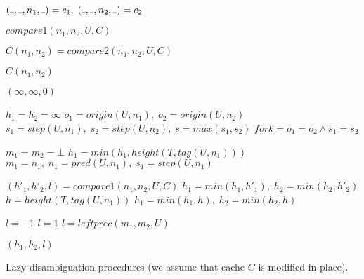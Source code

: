 \documentclass[AMA,STIX1COL]{WileyNJD-v2}
\newcommand{\Xund}{\rule{.4em}{.4pt}}
\begin{document}
\begin{algorithm}[H] \DontPrintSemicolon {} 
\begin{multicols}{2}

     {
        $(\Xund, \Xund, n_1, \Xund) = c_1, \; (\Xund, \Xund, n_2, \Xund) = c_2$ \;

        \BlankLine
        \Return $compare1 (n_1, n_2, U, C)$ \;
    }
    \BlankLine
    \BlankLine

     {
         {
            $C(n_1, n_2) = compare2 (n_1, n_2, U, C)$ \;
        }

        \BlankLine
        \Return $C(n_1, n_2)$ \;
    }
    \BlankLine
    \BlankLine

    \vfill
    \columnbreak

     {
         {
            \Return $(\infty, \infty, 0)$
        }

        \BlankLine
        $h_1 = h_2 = \infty$ \;
        $o_1 = origin(U, n_1), \; o_2 = origin(U, n_2)$ \;
        $s_1 = step(U, n_1), \; s_2 = step(U, n_2), \; s = max (s_1, s_2)$ \;
        $f\!ork = o_1 = o_2 \wedge s_1 = s_2$ \;

        \BlankLine
        $m_1 = m_2 = \bot$ \;
         {
             {
                $h_1 = min(h_1, height(T, tag(U, n_1)))$ \;
                $m_1 = n_1, \; n_1 = pred(U, n_1), \; s_1 = step(U, n_1)$ \;
            }
        }

        \BlankLine
         {
            $(h'_1, h'_2, l) = compare1(n_1, n_2, U, C)$ \;
            $h_1 = min(h_1, h'_1), \; h_2 = min(h_2, h'_2)$ \;
        }
         {
            $h = height(T, tag(U, n_1))$ \;
            $h_1 = min(h_1, h), \; h_2 = min(h_2, h)$ \;
        }

        \BlankLine
         {$l = -1$}
         {$l = 1$ }
            {$l = le\!f\!tprec(m_1, m_2, U)$}

        \BlankLine
        \Return $(h_1, h_2, l)$ \;
    }
    \BlankLine
    \BlankLine

\end{multicols}
\vspace{1em}
\caption{Lazy disambiguation procedures (we assume that cache $C$ is modified in-place).}
\end{algorithm}
\medskip
\end{document}
